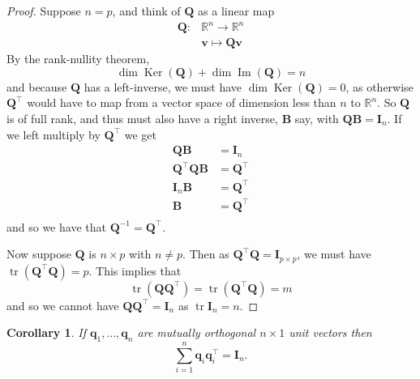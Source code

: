 \documentclass[]{book}
\newtheorem{corollary}{Corollary}[chapter]
\theoremstyle{definition}
\theoremstyle{definition}
\theoremstyle{definition}
\theoremstyle{remark}
\begin{document}
\begin{proof}
{}Suppose \(n=p\), and think of \(\mathbf Q\) as a linear map
\begin{align*}
\mathbf Q: &\mathbb{R}^n \rightarrow \mathbb{R}^n\\
&\mathbf v\mapsto \mathbf Q\mathbf v
\end{align*}
By the rank-nullity theorem,
\[\dim \operatorname{Ker}(\mathbf Q) + \dim \operatorname{Im}(\mathbf Q) =n\]
and because \(\mathbf Q\) has a left-inverse, we must have \(\dim \operatorname{Ker}(\mathbf Q)=0\), as otherwise \(\mathbf Q^\top\) would have to map from a vector space of dimension less than \(n\) to \(\mathbb{R}^n\). So \(\mathbf Q\) is of full rank, and thus must also have a right inverse, \(\mathbf B\) say, with \(\mathbf Q\mathbf B=\mathbf I_n\). If we left multiply by \(\mathbf Q^\top\) we get
\begin{align*}
\mathbf Q\mathbf B&=\mathbf I_n\\
\mathbf Q^\top\mathbf Q\mathbf B&=\mathbf Q^\top\\
\mathbf I_n \mathbf B&= \mathbf Q^\top\\
\mathbf B&= \mathbf Q^\top\\
\end{align*}
and so we have that \(\mathbf Q^{-1}=\mathbf Q^\top\).

Now suppose \(\mathbf Q\) is \(n \times p\) with \(n\not = p\). Then as
\(\mathbf Q^\top \mathbf Q=\mathbf I_{p\times p}\), we must have \(\operatorname{tr}(\mathbf Q^\top \mathbf Q)=p\). This implies that
\[\operatorname{tr}(\mathbf Q\mathbf Q^\top)=\operatorname{tr}(\mathbf Q^\top \mathbf Q)=m\] and so
we cannot have \(\mathbf Q\mathbf Q^\top=\mathbf I_{n}\) as \(\operatorname{tr}{\mathbf I_{n}}=n\).
\end{proof}

\begin{corollary}
\protect\hypertarget{cor:two1}{}{\label{cor:two1} }If \(\mathbf q_1, \ldots , \mathbf q_n\) are mutually orthogonal \(n \times 1\) unit vectors then
\[
\sum_{i=1}^n \mathbf q_i \mathbf q_i^\top = {\mathbf I}_n.
\]
\end{corollary}
\end{document}
